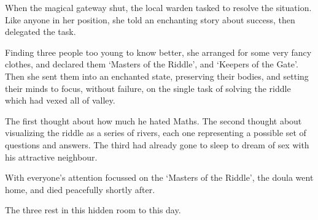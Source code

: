 \setcounter{r4}{5}

\begin{exampletext}
  When the magical gateway shut, the local \gls{warden} tasked  to resolve the situation.
  Like anyone in her position, she told an enchanting story about success, then delegated the task.

  Finding three people too young to know better, she arranged for some very fancy clothes, and declared them `Masters of the Riddle', and `Keepers of the Gate'.
  Then she sent them into an enchanted state, preserving their bodies, and setting their minds to focus, without failure, on the single task of solving the riddle which had vexed all of \gls{valley}.

  The first thought about how much he hated Maths.
  The second thought about visualizing the riddle as a series of rivers, each one representing a possible set of questions and answers.
  The third had already gone to sleep to dream of sex with his attractive neighbour.

  With everyone's attention focussed on the `Masters of the Riddle', the \gls{doula} went home, and died peacefully shortly after.

  The three rest in this hidden room to this day.
\end{exampletext}


